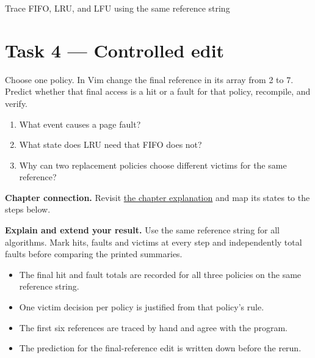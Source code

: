 \begin{labproject}{Trace FIFO, LRU, and LFU using the same reference string}
\section*{Task 4 --- Controlled edit}
Choose one policy. In Vim change the final reference in its array from 2 to 7. Predict whether that final access is a hit or a fault for that policy, recompile, and verify.

\begin{quickcheck}
\begin{enumerate}
  \item What event causes a page fault?
  \item What state does LRU need that FIFO does not?
  \item Why can two replacement policies choose different victims for the same reference?
\end{enumerate}
\end{quickcheck}

\textbf{Chapter connection.} Revisit \hyperref[ch:vm]{the chapter explanation} and map its states to the steps below.


\begin{verification}
\textbf{Explain and extend your result.} Use the same reference string for all algorithms. Mark hits, faults and victims at every step and independently total faults before comparing the printed summaries.


\begin{itemize}
  \item The final hit and fault totals are recorded for all three policies on the same reference string.
  \item One victim decision per policy is justified from that policy's rule.
  \item The first six references are traced by hand and agree with the program.
  \item The prediction for the final-reference edit is written down before the rerun.
\end{itemize}
\end{verification}
\end{labproject}
